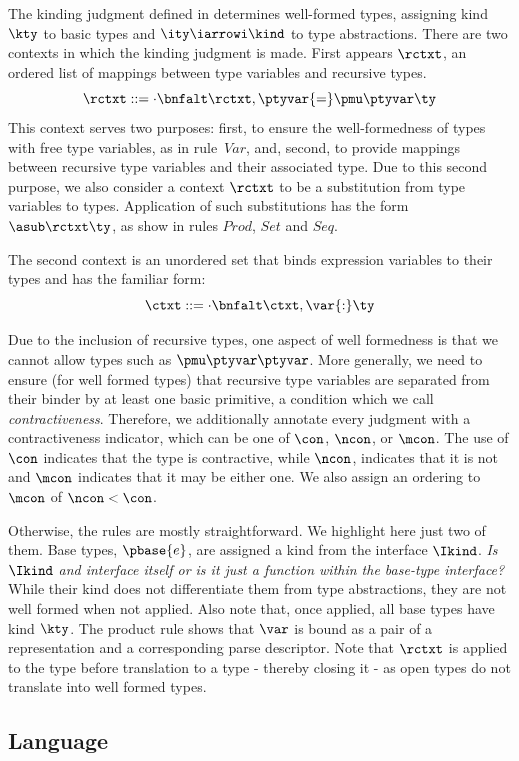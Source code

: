 The kinding judgment defined in  determines
well-formed \ddc{} types, assigning kind $\kty$ to basic types and
$\ity \iarrowi \kind$ to type abstractions. There are two contexts in
which the kinding judgment is made. First appears $\rctxt$, an ordered
list of mappings between type variables and recursive types.
\[
\rctxt \mathrel{::=} \cdot \bnfalt \rctxt,\ptyvar{=}\pmu \ptyvar \ty
\]
This context serves two purposes: first, to ensure the well-formedness
of types with free type variables, as in rule~${Var}$, and, second, to
provide mappings between recursive type variables and their associated
type. Due to this second purpose, we also consider a context $\rctxt$
to be a substitution from type variables to types. Application of such
substitutions has the form $\asub \rctxt \ty$, as show in rules
$Prod$, $Set$ and $Seq$.

The second context is an unordered set that binds expression variables
to their types and has the familiar form:
\[
\ctxt \mathrel{::=} \cdot \bnfalt \ctxt,{\var{:}\ty}
\]

Due to the inclusion of recursive types, one aspect of well
formedness is that we cannot allow types such as $\pmu \ptyvar
\ptyvar$. More generally, we need to ensure (for well formed types) that
recursive type variables are separated from their binder by at least
one basic primitive, a condition which we call {\it contractiveness}.
Therefore, we additionally annotate every judgment with a contractiveness
indicator, which can be one of $\con$, $\ncon$, or $\mcon$. The use of
$\con$ indicates that the type is contractive, while $\ncon$,
indicates that it is not and $\mcon$ indicates that it may be either
one. We also assign an ordering to $\mcon$ of $\ncon < \con$. 

Otherwise, the rules are mostly straightforward. We highlight here
just two of them. Base types, $\pbase{e}$, are assigned a kind from
the interface $\Ikind$.  {\em Is $\Ikind$ and interface itself or is
  it just a function within the base-type interface?} While their kind
does not differentiate them from type abstractions, they are not well
formed when not applied.  Also note that, once applied, all base types
have kind $\kty$. The product rule shows that $\var$ is bound as a
pair of a representation and a corresponding parse descriptor. Note
that $\rctxt$ is applied to the type before translation to a
\implang{} type - thereby closing it - as open \ddc{} types do not
translate into well formed \implang{} types.

\subsection{\Implang{} Language}

